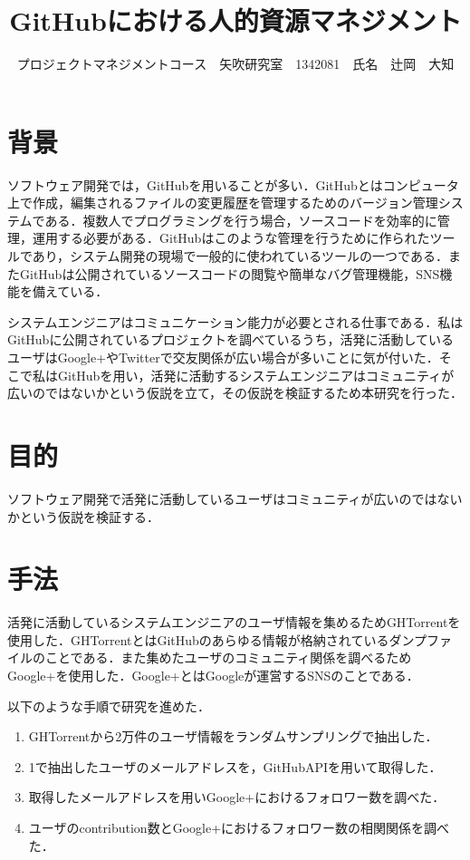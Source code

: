 \documentclass[uplatex,twocolumn,dvipdfmx]{jsarticle}
\title{\vspace{-5mm}\fontsize{14pt}{0pt}\selectfont GitHubにおける人的資源マネジメント}
\author{\normalsize プロジェクトマネジメントコース　矢吹研究室　1342081　氏名　辻岡　大知}
\date{}
\begin{document}
\fontsize{10.5pt}{\baselineskip}\selectfont
\maketitle





\section{背景}

ソフトウェア開発では，GitHubを用いることが多い．GitHubとはコンピュータ上で作成，編集されるファイルの変更履歴を管理するためのバージョン管理システムである．複数人でプログラミングを行う場合，ソースコードを効率的に管理，運用する必要がある．GitHubはこのような管理を行うために作られたツールであり，システム開発の現場で一般的に使われているツールの一つである\cite{a}．またGitHubは公開されているソースコードの閲覧や簡単なバグ管理機能，SNS機能を備えている．

システムエンジニアはコミュニケーション能力が必要とされる仕事である．私はGitHubに公開されているプロジェクトを調べているうち，活発に活動しているユーザはGoogle+やTwitterで交友関係が広い場合が多いことに気が付いた．そこで私はGitHubを用い，活発に活動するシステムエンジニアはコミュニティが広いのではないかという仮説を立て，その仮説を検証するため本研究を行った．


\section{目的}

ソフトウェア開発で活発に活動しているユーザはコミュニティが広いのではないかという仮説を検証する．

\section{手法}

活発に活動しているシステムエンジニアのユーザ情報を集めるためGHTorrentを使用した．GHTorrentとはGitHubのあらゆる情報が格納されているダンプファイルのことである．また集めたユーザのコミュニティ関係を調べるためGoogle+を使用した．Google+とはGoogleが運営するSNSのことである．

以下のような手順で研究を進めた．

\begin{enumerate}
 \item GHTorrentから2万件のユーザ情報をランダムサンプリングで抽出した．
 \item 1で抽出したユーザのメールアドレスを，GitHubAPIを用いて取得した．
 \item 取得したメールアドレスを用いGoogle+におけるフォロワー数を調べた．
 \item ユーザのcontribution数とGoogle+におけるフォロワー数の相関関係を調べた．
\end{enumerate}
\end{document}
